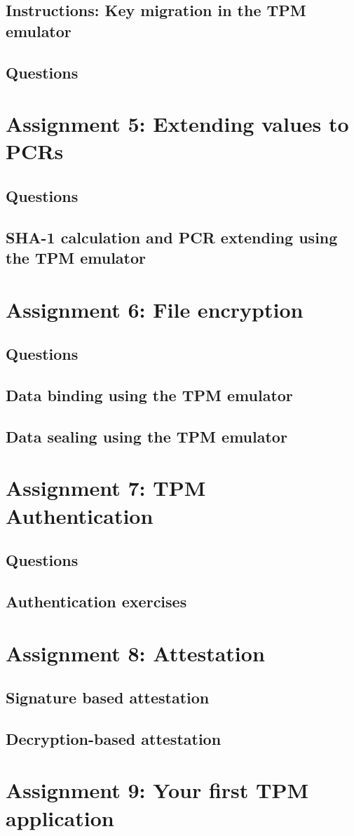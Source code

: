 \documentclass[10pt]{article}
\begin{document}
\subsection{Instructions: Key migration in the TPM emulator}
\subsection{Questions}

\section{Assignment 5: Extending values to PCRs}
\subsection{Questions}
\subsection{SHA-1 calculation and PCR extending using the TPM emulator}
\section{Assignment 6: File encryption}
\subsection{Questions}
\subsection{Data binding using the TPM emulator}
\subsection{Data sealing using the TPM emulator}
\section{Assignment 7: TPM Authentication}
\subsection{Questions}
\subsection{Authentication exercises}
\section{Assignment 8: Attestation}
\subsection{Signature based attestation}
\subsection{Decryption-based attestation}
\section{Assignment 9: Your first TPM application}
\end{document}
